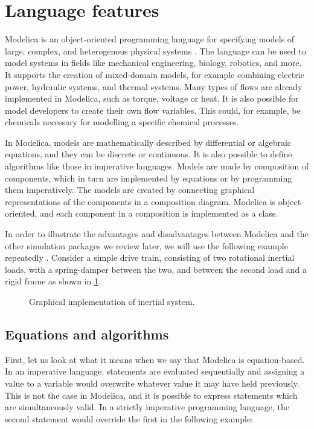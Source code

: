 \documentclass[\rootfolder/main.tex]{subfiles}
\begin{document}
\section{Language features}

Modelica is an object-oriented programming language for specifying models of large, complex, and heterogenous physical systems \cite{clauss2002}.
The language can be used to model systems in fields like mechanical engineering, biology, robotics, and more.
It supports the creation of mixed-domain models, for example combining electric power, hydraulic systems, and thermal systems.
Many types of flows are already implemented in Modelica, such as torque, voltage or heat.
It is also possible for model developers to create their own flow variables.
This could, for example, be chemicals necessary for modelling a specific chemical processes.

In Modelica, models are mathematically described by differential or algebraic equations, and they can be discrete or continuous.
It is also possible to define algorithms like those in imperative languages.
Models are made by composition of components, which in turn are implemented by equations or by programming them imperatively.
The models are created by connecting graphical representations of the components in a composition diagram.
Modelica is object-oriented, and each component in a composition is implemented as a class.

In order to illustrate the advantages and disadvantages between Modelica and the other simulation packages we review later, we will use the following example repeatedly \footnotemark.
Consider a simple drive train, consisting of two rotational inertial loads, with a spring-damper between the two, and between the second load and a rigid frame as shown in \cref{fig:inertial}.


\begin{figure}[ht]
    \caption{Graphical implementation of inertial system.\label{fig:inertial}}
\end{figure}

\subsection{Equations and algorithms}

First, let us look at what it means when we say that Modelica is equation-based.
In an imperative language, statements are evaluated sequentially and assigning a value to a variable would overwrite whatever value it may have held previously.
This is not the case in Modelica, and it is possible to express statements which are simultaneously valid.
In a strictly imperative programming language, the second statement would override the first in the following example:
\end{document}
